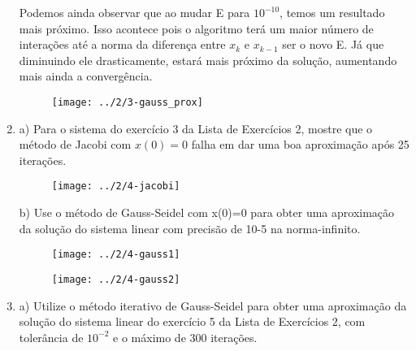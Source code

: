 \documentclass[leqno]{article}
\numberwithin{equation}{section}
\begin{document}
\begin{enumerate}
\begin{sol}
			Podemos ainda observar que ao mudar E para $10^{-10}$, temos um resultado mais próximo. Isso acontece pois o algoritmo terá um maior número de interações até a norma da diferença entre $x_k$ e $x_{k-1}$ ser o novo E. Já que diminuindo ele drasticamente, estará mais próximo da solução, aumentando mais ainda a convergência.
			
			\begin{figure}[H]
				\centering
				\texttt{[image: ../2/3-gauss\_prox]}
			\end{figure}
			
			
		\end{sol}
	
		
		\item a) Para o sistema do exercício 3 da Lista de Exercícios 2, mostre
		que o método de Jacobi com $x(0)=0$ falha em dar uma boa
		aproximação após 25 iterações.
		
		\begin{figure}[H]
			\centering
			\texttt{[image: ../2/4-jacobi]}
			
		\end{figure}
		
		b) Use o método de Gauss-Seidel com x(0)=0 para obter uma
		aproximação da solução do sistema linear com precisão de 10-5 na
		norma-infinito.
		
		\begin{sol}
			
		\begin{figure}[H]
			\centering
			\texttt{[image: ../2/4-gauss1]}
		\end{figure}
		
		\begin{figure}[H]
			\centering
			\texttt{[image: ../2/4-gauss2]}
		\end{figure}
			
			
		\end{sol}
		
		
		\item a) Utilize o método iterativo de Gauss-Seidel para obter uma
		aproximação da solução do sistema linear do exercício 5 da Lista
		de Exercícios 2, com tolerância de $10^{-2}$ e o máximo de 300
		iterações.
		

\end{enumerate}
\end{document}

